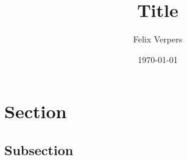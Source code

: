\documentclass[]{article}
\begin{document}
\title{Title}
\author{Felix Verpers}
\date{\today}
\maketitle
\section*{Section}
\subsection*{Subsection}



\end{document}
